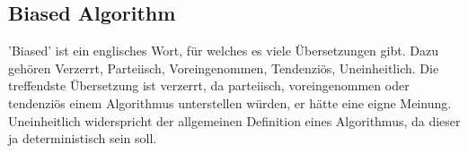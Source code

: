 \subsection{Biased Algorithm}
'Biased' ist ein englisches Wort, für welches es viele Übersetzungen gibt. Dazu gehören Verzerrt, Parteiisch, Voreingenommen, Tendenziös, Uneinheitlich. Die treffendste Übersetzung ist verzerrt, da parteiisch, voreingenommen oder tendenziös einem Algorithmus unterstellen würden, er hätte eine eigne Meinung. Uneinheitlich widerspricht der allgemeinen Definition eines Algorithmus, da dieser ja deterministisch sein soll.  

